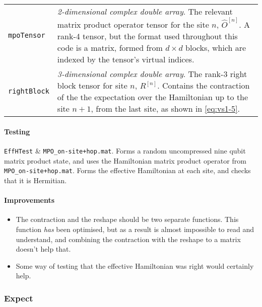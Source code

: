 \begin{longtabu}{X[1,l]X[2,l]}
 \lstinline$mpoTensor$ & \emph{2-dimensional complex double array}. The relevant matrix product operator tensor for the site \(n\), \(\hat{O}^{[n]}\). A rank-4 tensor, but the format used throughout this code is a matrix, formed from \(d \times d\) blocks, which are indexed by the tensor's virtual indices.\\
 \lstinline$rightBlock$ & \emph{3-dimensional complex double array}. The rank-3 right block tensor for site \(n\), \(R^{[n]}\). Contains the contraction of the the expectation over the Hamiltonian up to the site \(n+1\), from the last site, as shown in \cref{eq:vs1-5}.\\
 \hline
 \end{longtabu}
 \paragraph{Testing}
 \lstinline$EffHTest$ \& \lstinline$MPO_on-site+hop.mat$. Forms a random uncompressed nine qubit matrix product state, and uses the Hamiltonian matrix product operator from \lstinline$MPO_on-site+hop.mat$. Forms the effective Hamiltonian at each site, and checks that it is Hermitian. 
 \paragraph{Improvements} 
 \begin{itemize}
 \item The contraction and the reshape should be two separate functions. This function \emph{has} been optimised, but as a result is almost impossible to read and understand, and combining the contraction with the reshape to a matrix doesn't help that. 
 \item Some way of testing that the effective Hamiltonian was right would certainly help. 
 \end{itemize}
 
 \subsubsection{Expect}
